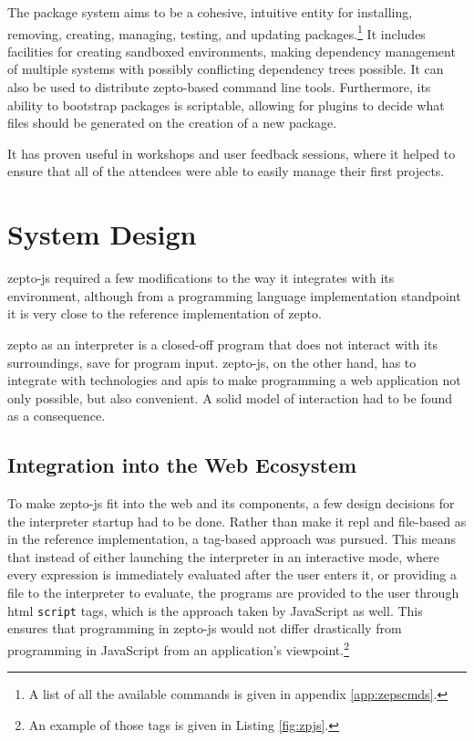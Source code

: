 \documentclass[oneside,11pt,xetex]{scrbook}
\begin{document}
The package system aims to be a cohesive, intuitive entity for installing,
removing, creating, managing, testing, and updating packages.\footnote{A list of
all the available commands is given in appendix \ref{app:zepscmds}.} It includes
facilities for creating sandboxed environments, making dependency management
of multiple systems with possibly conflicting dependency trees possible.
It can also be used to distribute zepto-based command line tools. Furthermore, its
ability to bootstrap packages is scriptable, allowing for plugins to
decide what files should be generated on the creation of a new package.

It has proven useful in workshops and user feedback sessions, where it helped
to ensure that all of the attendees were able to easily manage their first
projects.

\chapter{System Design}
\label{chap:SystemDesign}

zepto-js required a few modifications to the way it integrates with its
environment, although from a programming language implementation standpoint
it is very close to the reference implementation of zepto.

zepto as an interpreter is a closed-off program that does not interact
with its surroundings, save for program input. zepto-js, on the other hand,
has to integrate with technologies and \glspl{api} to make programming
a web application not only possible, but also convenient. A solid model of
interaction had to be found as a consequence.

\section{Integration into the Web Ecosystem}

To make zepto-js fit into the web and its components, a few design decisions
for the interpreter startup had to be done. Rather than make it \gls{repl} and
file-based as in the reference implementation, a tag-based approach was pursued.
This means that instead of either launching the interpreter in an interactive
mode, where every expression is immediately evaluated after the user enters it,
or providing a file to the interpreter to evaluate, the programs are provided
to the user through \gls{html} \texttt{script} tags, which is the approach
taken by JavaScript as well. This ensures that programming in zepto-js would
not differ drastically from programming in JavaScript from an application's
viewpoint.\footnote{An example of those tags is given in Listing \ref{fig:zpjs}.}
\end{document}
